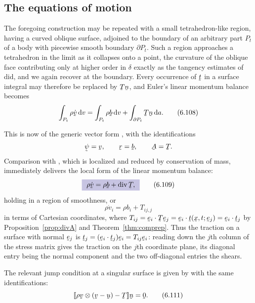 \subsection*{The equations of motion}

The foregoing construction may be repeated with a small
tetrahedron-like region, having a curved oblique surface, adjoined to
the boundary of an arbitrary part $P_{t}$ of a body with piecewise
smooth boundary $\partial P_{t}$. Such a region approaches a
tetrahedron in the limit as it collapses onto a point, the curvature of
the oblique face contributing only at higher order in $\delta$ exactly
as the tangency estimates of  did, and we again recover
 at the boundary. Every occurrence of $\bt$ in a surface
integral may therefore be replaced by $\bT\bn$, and Euler's linear
momentum balance  becomes
\begin{equation}
   \int_{P_{t}}\rho\dot\bv\,\dl v=\int_{P_{t}}\rho\bb\,\dl v
   +\int_{\partial P_{t}}\bT\bn\,\dl a .
   \tag{6.108}\label{eq:6.108}
\end{equation}

This is now of the generic vector form , with the
identifications
\[
   \vek\psi=\bv,\qquad \br=\bb,\qquad \bA=\bT .
\]
Comparison with , which is  localized and reduced by
conservation of mass, immediately delivers the local form of the linear
momentum balance:
\begin{equation}
   \boxed{\ \rho\dot\bv=\rho\bb+\dvg\bT ,\ }
   \tag{6.109}\label{eq:6.109}
\end{equation}
holding in a region of smoothness, or
\begin{equation}
   \rho\dot v_{i}=\rho b_{i}+T_{ij,j}
   \tag{6.110}\label{eq:6.110}
\end{equation}
in terms of Cartesian coordinates, where
$T_{ij}=\ip{\be_{i}}{\bT\be_{j}}=\ip{\be_{i}}{\bt(\bx,t;\be_{j})}
=\ip{\be_{i}}{\bt_{j}}$ by Proposition~\ref{prop:divA} and
Theorem~\ref{thm:comprep}. Thus the traction on a surface with normal
$\be_{j}$ is $\bt_{j}=(\ip{\be_{i}}{\bt_{j}})\be_{i}=T_{ij}\be_{i}$:
reading down the $j$th column of the stress matrix gives the traction
on the $j$th coordinate plane, its diagonal entry being the normal
component and the two off-diagonal entries the shears.

The relevant jump condition at a singular surface is given by
 with the same identifications:
\begin{equation}
   \jump{\rho\bv\otimes(\bv-\bu)-\bT}\bn=\bze .
   \tag{6.111}\label{eq:6.111}
\end{equation}

